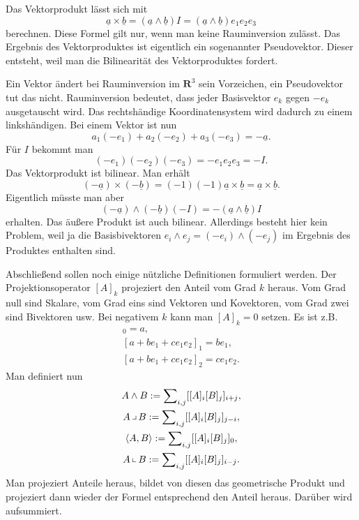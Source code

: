 \documentclass[a4paper,10pt,fleqn,twocolumn,twoside]{article}
\begin{document}
Das Vektorprodukt lässt sich mit
\[\underline a\times\underline b = (\underline a\wedge\underline b)I
= (\underline a\wedge\underline b)e_1e_2e_3\]
\noindent
berechnen. Diese Formel gilt nur, wenn man keine Rauminversion
zulässt. Das Ergebnis des Vektorproduktes ist eigentlich ein
sogenannter Pseudovektor. Dieser entsteht, weil man die
Bilinearität des Vektorproduktes fordert.

Ein Vektor ändert bei Rauminversion im \(\mathbf R^3\) sein
Vorzeichen, ein Pseudovektor tut das nicht. Rauminversion bedeutet,
dass jeder Basisvektor \(e_k\) gegen \(-e_k\) ausgetauscht wird.
Das rechtshändige Koordinatensystem wird dadurch zu einem
linkshändigen. Bei einem Vektor ist nun
\[a_1(-e_1)+a_2(-e_2)+a_3(-e_3) = -\underline a.\]
Für \(I\) bekommt man
\[(-e_1)(-e_2)(-e_3) = -e_1e_2e_3 = -I.\]
Das Vektorprodukt ist bilinear. Man erhält
\[(-\underline a)\times (-\underline b)
= (-1)(-1)\underline a\times\underline b
= \underline a\times\underline b.\]
Eigentlich müsste man aber
\[(-\underline a)\wedge (-\underline b)(-I)
= -(\underline a\wedge\underline b)I\]
erhalten. Das äußere Produkt ist auch bilinear. Allerdings besteht
hier kein Problem, weil ja die Basisbivektoren
\(e_i\wedge e_j = (-e_i)\wedge(-e_j)\) im Ergebnis des Produktes
enthalten sind.

Abschließend sollen noch einige nützliche Definitionen formuliert
werden. Der Projektionsoperator \([A]_k\) projeziert den Anteil
vom Grad \(k\) heraus. Vom Grad null sind Skalare, vom Grad eins
sind Vektoren und Kovektoren, vom Grad zwei sind Bivektoren
usw. Bei negativem \(k\) kann man \([A]_k=0\) setzen.
Es ist z.B.
\begin{gather*}
[a+be_1+ce_1e_2]_0 = a,\\
[a+be_1+ce_1e_2]_1 = be_1,\\
[a+be_1+ce_1e_2]_2 = ce_1e_2.
\end{gather*}
Man definiert nun
\begin{gather*}
A\wedge B := \sum\nolimits_{i,j} [[A]_i[B]_j]_{i+j},\\
A\,\big\lrcorner\,B := \sum\nolimits_{i,j} [[A]_i[B]_j]_{j-i},\\
\langle A,B\rangle := \sum\nolimits_{i,j} [[A]_i[B]_j]_0,\\
A\,\big\llcorner\,B := \sum\nolimits_{i,j} [[A]_i[B]_j]_{i-j}.
\end{gather*}
Man projeziert Anteile heraus, bildet von diesen das geometrische
Produkt und projeziert dann wieder der Formel entsprechend den Anteil
heraus. Darüber wird aufsummiert.
\end{document}
